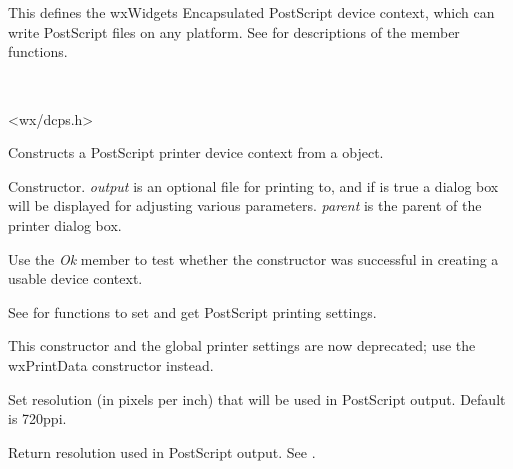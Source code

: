 \section{}\label{wxpostscriptdc}

This defines the wxWidgets Encapsulated PostScript device context,
which can write PostScript files on any platform. See  for
descriptions of the member functions.


\\


<wx/dcps.h>

\label{wxpostscriptdcctor}


Constructs a PostScript printer device context from a  object.


Constructor. {\it output} is an optional file for printing to, and if
 is true a dialog box will be displayed for adjusting
various parameters. {\it parent} is the parent of the printer dialog box.

Use the {\it Ok} member to test whether the constructor was successful
in creating a usable device context.

See  for functions to set and
get PostScript printing settings.

This constructor and the global printer settings are now deprecated;
use the wxPrintData constructor instead.


\label{wxpostscriptdcsetresolution}


Set resolution (in pixels per inch) that will be used in PostScript
output. Default is 720ppi.

\label{wxpostscriptdcgetresolution}


Return resolution used in PostScript output. See 
.

